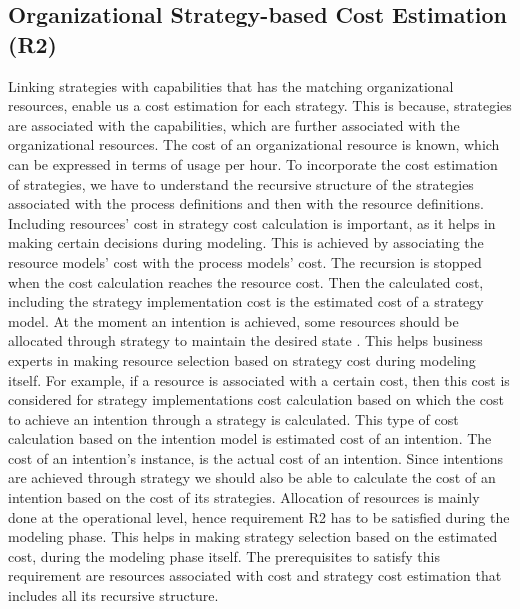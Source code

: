 \subsection{Organizational Strategy-based Cost Estimation (R2)}
Linking strategies with capabilities that has the matching organizational resources, enable us a cost estimation for each strategy. This is because, strategies are associated with the capabilities, which are further associated with the organizational resources. The cost of an organizational resource is known, which can be expressed in terms of usage per hour. To incorporate the cost estimation of strategies, we have to understand the recursive structure of the strategies associated with the process definitions and then with the resource definitions. Including resources' cost in strategy cost calculation is important, as it helps in making certain decisions during modeling. This is achieved by associating the resource models' cost with the process models' cost. The recursion is stopped when the cost calculation reaches the resource cost. Then the calculated cost, including the strategy implementation cost is the estimated cost of a strategy model. At the moment an intention is achieved, some resources should be allocated through strategy to maintain the desired state \cite{Mandic2010}. This helps business experts in making resource selection based on strategy cost during modeling itself. For example, if a resource is associated with a certain cost,  then this cost is considered for strategy implementations cost calculation based on which the cost to achieve an intention through a strategy is calculated. This type of cost calculation based on the intention model is estimated cost of an intention. The cost of an intention's instance, is the actual cost of an intention. Since intentions are achieved through strategy we should also be able to calculate the cost of an intention based on the cost of its strategies. Allocation of resources is mainly done at the operational level, hence requirement R2 has to be satisfied during the modeling phase. This helps in making strategy selection based on the estimated cost, during the modeling phase itself. The prerequisites to satisfy this requirement are resources associated with cost and strategy cost estimation that includes all its recursive structure.

